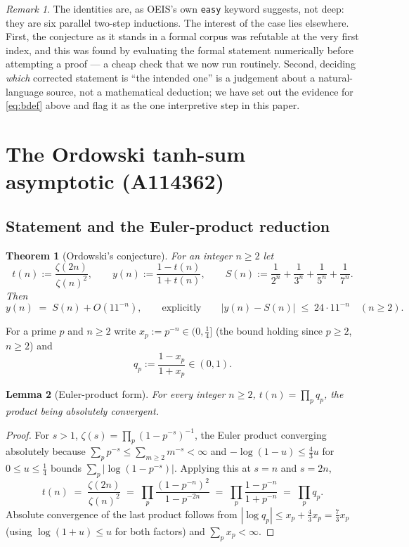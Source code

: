 \documentclass[11pt]{article}
\theoremstyle{plain}
\newtheorem{theorem}{Theorem}[section]
\newtheorem{lemma}[theorem]{Lemma}
\theoremstyle{definition}
\theoremstyle{remark}
\newtheorem*{remark}{Remark}
\numberwithin{equation}{section}
\begin{document}
\begin{remark}
The identities are, as OEIS's own \texttt{easy} keyword suggests, not deep: they are six parallel
two-step inductions. The interest of the case lies elsewhere. First, the conjecture as it stands
in a formal corpus was refutable at the very first index, and this was found by evaluating the
formal statement numerically before attempting a proof --- a cheap check that we now run
routinely. Second, deciding \emph{which} corrected statement is ``the intended one'' is a
judgement about a natural-language source, not a mathematical deduction; we have set out the
evidence for \eqref{eq:bdef} above and flag it as the one interpretive step in this paper.
\end{remark}

\section{The Ordowski tanh-sum asymptotic (A114362)}
\label{sec:a114362}

\subsection{Statement and the Euler-product reduction}

\begin{theorem}[Ordowski's conjecture]
\label{thm:a114362}
For an integer $n \ge 2$ let
\[
  t(n) := \frac{\zeta(2n)}{\zeta(n)^2}, \qquad
  y(n) := \frac{1-t(n)}{1+t(n)}, \qquad
  S(n) := \frac{1}{2^n}+\frac{1}{3^n}+\frac{1}{5^n}+\frac{1}{7^n}.
\]
Then
\[
  y(n) \;=\; S(n) + O(11^{-n}), \qquad\text{explicitly}\qquad
  \bigl| y(n) - S(n) \bigr| \;\le\; 24 \cdot 11^{-n} \quad (n \ge 2).
\]
\end{theorem}

For a prime $p$ and $n \ge 2$ write $x_p := p^{-n} \in (0, \tfrac14]$ (the bound holding since
$p \ge 2$, $n \ge 2$) and
\[
  q_p := \frac{1-x_p}{1+x_p} \in (0,1).
\]

\begin{lemma}[Euler-product form]
\label{lem:ordowski-euler}
For every integer $n \ge 2$, $\displaystyle t(n) = \prod_p q_p$, the product being absolutely
convergent.
\end{lemma}

\begin{proof}
For $s>1$, $\zeta(s) = \prod_p (1-p^{-s})^{-1}$, the Euler product converging absolutely because
$\sum_p p^{-s} \le \sum_{m\ge2} m^{-s} < \infty$ and $-\log(1-u) \le \tfrac43 u$ for $0 \le u \le
\tfrac14$ bounds $\sum_p |\log(1-p^{-s})|$. Applying this at $s=n$ and $s=2n$,
\[
  t(n) \;=\; \frac{\zeta(2n)}{\zeta(n)^2}
  \;=\; \prod_p \frac{(1-p^{-n})^2}{1-p^{-2n}}
  \;=\; \prod_p \frac{1-p^{-n}}{1+p^{-n}} \;=\; \prod_p q_p.
\]
Absolute convergence of the last product follows from $|\log q_p| \le x_p + \tfrac43 x_p =
\tfrac73 x_p$ (using $\log(1+u)\le u$ for both factors) and $\sum_p x_p < \infty$.
\end{proof}
\end{document}

